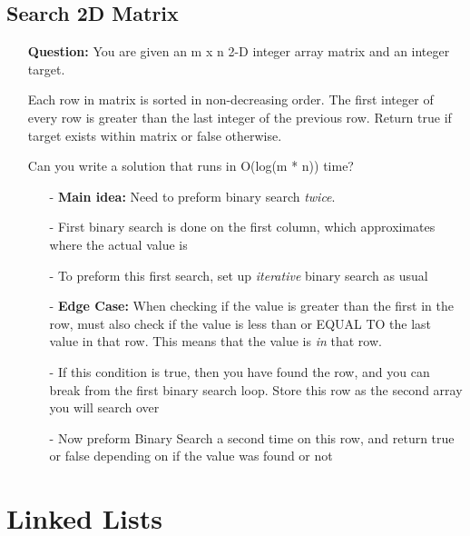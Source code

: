 \documentclass[12pt]{article}
\begin{document}
\subsection{Search 2D Matrix}
\begin{enumerate}
  \item[] \textbf{Question:} You are given an m x n 2-D integer array matrix and an integer target.

  Each row in matrix is sorted in non-decreasing order.
  The first integer of every row is greater than the last integer of the previous row.
  Return true if target exists within matrix or false otherwise.

Can you write a solution that runs in O(log(m * n)) time?
    \begin{enumerate}
      \item[-] \textbf{Main idea:} Need to preform binary search \textit{twice}.
      \item[-] First binary search is done on the first column, which approximates where the actual value is 
      \item[-] To preform this first search, set up \textit{iterative} binary search as usual
      \item[-] \textbf{Edge Case:} When checking if the value is greater than the first in the row, must also check if the value is less than or EQUAL TO the last value in that row. This means that the value is \textit{in} that row.
      \item[-] If this condition is true, then you have found the row, and you can break from the first binary search loop. Store this row as the second array you will search over 
      \item[-] Now preform Binary Search a second time on this row, and return true or false depending on if the value was found or not

    \end{enumerate}
\end{enumerate}

\section{Linked Lists}
\end{document}
